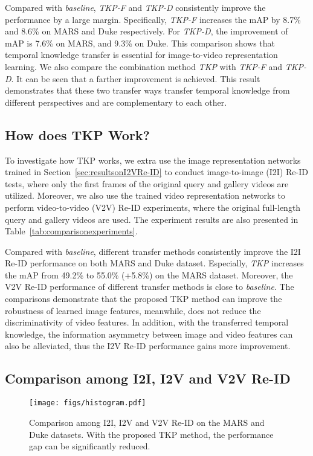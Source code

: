 \documentclass[10pt,twocolumn,letterpaper]{article}
\begin{document}
Compared with \textit{baseline}, \textit{TKP-F} and \textit{TKP-D} consistently improve the performance by a large margin. 
Specifically, \textit{TKP-F} increases the mAP by 8.7\% and 8.6\% on MARS and Duke respectively.
For \textit{TKP-D}, the improvement of mAP is 7.6\% on MARS, and 9.3\% on Duke.
This comparison shows that temporal knowledge transfer is essential for image-to-video representation learning.
We also compare the combination method \textit{TKP} with \textit{TKP-F} and \textit{TKP-D}.
It can be seen that a farther improvement is achieved.
This result demonstrates that these two transfer ways transfer temporal knowledge from different perspectives and are complementary to each other.


\subsection{How does TKP Work?}

To investigate how TKP works, we extra use the image representation networks trained in Section~\ref{sec:resultsonI2VRe-ID} to conduct image-to-image (I2I) Re-ID tests, where only the first frames of the original query and gallery videos are utilized.
Moreover, we also use the trained video representation networks to perform video-to-video (V2V) Re-ID experiments, where the original full-length query and gallery videos are used. 
The experiment results are also presented in Table~\ref{tab:comparisonexperiments}.

Compared with \textit{baseline}, different transfer methods consistently improve the I2I Re-ID performance on both MARS and Duke dataset.
Especially, \textit{TKP} increases the mAP from 49.2\% to 55.0\% (+5.8\%) on the  MARS dataset.
Moreover, the V2V Re-ID performance of different transfer methods is close to \textit{baseline}.
The comparisons demonstrate that the proposed TKP method can improve the robustness of learned image features, meanwhile, does not reduce the discriminativity of video features.
In addition, with the transferred temporal knowledge, the information asymmetry between image and video features can also be alleviated, thus the I2V Re-ID performance gains more improvement.

\subsection{Comparison among I2I, I2V and V2V Re-ID}

\begin{figure}[t]
	\begin{center}
		\texttt{[image: figs/histogram.pdf]}
	\end{center}
	\vspace{-15pt}
	\caption{Comparison among I2I, I2V and V2V Re-ID on the MARS and Duke datasets. With the proposed TKP method, the performance gap can be significantly reduced.}
	\vspace{-15pt}
	\label{fig:comparei2ii2vv2v}
\end{figure}
\end{document}
